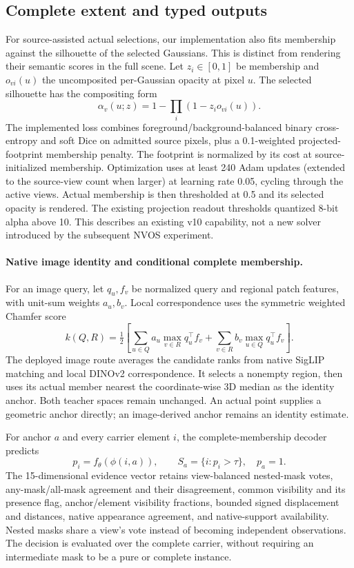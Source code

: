 \subsection{Complete extent and typed outputs}
For source-assisted actual selections, our implementation also fits membership
against the silhouette of the selected Gaussians. This is distinct from rendering
their semantic scores in the full scene. Let $z_i\in[0,1]$ be membership and
$o_{vi}(u)$ the uncomposited per-Gaussian opacity at pixel $u$. The selected
silhouette has the compositing form
\begin{equation}
 \alpha_v(u;z)=1-\prod_i(1-z_i o_{vi}(u)).
\end{equation}
The implemented loss combines foreground/background-balanced binary
cross-entropy and soft Dice on admitted source pixels, plus a 0.1-weighted
projected-footprint membership penalty. The footprint is normalized by its
cost at source-initialized membership. Optimization uses at least 240 Adam
updates (extended to the source-view count when larger) at learning rate 0.05,
cycling through the active views. Actual membership is then
thresholded at 0.5 and its selected opacity is rendered. The existing projection
readout thresholds quantized 8-bit alpha above 10. This describes an existing
v10 capability, not a new solver introduced by the subsequent NVOS experiment.

\paragraph{Native image identity and conditional complete membership.}
For an image query, let $q_u,f_v$ be normalized query and regional patch
features, with unit-sum weights $a_u,b_v$. Local correspondence uses the
symmetric weighted Chamfer score
\begin{equation}
 k(Q,R)=\tfrac12\left[\sum_{u\in Q}a_u\max_{v\in R}q_u^\top f_v+
                         \sum_{v\in R}b_v\max_{u\in Q}q_u^\top f_v\right].
\end{equation}
The deployed image route averages the candidate ranks from native SigLIP
matching and local DINOv2 correspondence. It selects a nonempty region, then
uses its actual member nearest the coordinate-wise 3D median as the identity
anchor. Both teacher spaces remain unchanged. An actual point supplies a
geometric anchor directly; an image-derived anchor remains an identity estimate.

For anchor $a$ and every carrier element $i$, the complete-membership decoder
predicts
\begin{equation}
 p_i=f_\theta(\phi(i,a)),\qquad S_a=\{i:p_i>\tau\},\quad p_a=1.
\end{equation}
The 15-dimensional evidence vector retains view-balanced nested-mask votes,
any-mask/all-mask agreement and their disagreement, common visibility and its
presence flag, anchor/element visibility fractions, bounded signed displacement
and distances, native appearance agreement, and native-support availability.
Nested masks share a view's vote instead of becoming independent observations.
The decision is evaluated over the complete carrier, without requiring an
intermediate mask to be a pure or complete instance.

